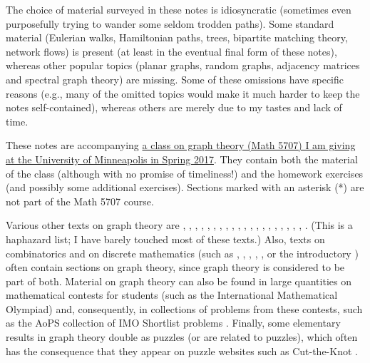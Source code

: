 \documentclass[numbers=enddot,12pt,final,onecolumn,notitlepage]{scrartcl}%
\theoremstyle{definition}
\begin{document}
The choice of material surveyed in these notes is idiosyncratic
(sometimes even purposefully trying to wander some seldom trodden
paths). Some standard material (Eulerian walks, Hamiltonian paths,
trees, bipartite matching theory, network flows) is present (at least
in the eventual final form of these notes), whereas
other popular topics (planar graphs, random graphs, adjacency matrices
and spectral graph theory) are missing. Some of these omissions have
specific reasons (e.g., many of the omitted topics would make it much
harder to keep the notes self-contained), whereas others are merely
due to my tastes and lack of time.

These notes are accompanying
\href{http://www.cip.ifi.lmu.de/~grinberg/t/17s}{a
class on graph theory (Math 5707) I am giving at the University of
Minneapolis in Spring 2017}. They contain both the
material of the class (although with no promise of timeliness!) and the
homework exercises (and possibly some additional exercises).
Sections marked with an asterisk (*) are not part of the Math 5707
course.

Various other texts on graph theory are \cite{Bollob79},
\cite{Bollob98}, \cite{Harary69}, \cite{Harju14}, \cite{Balakr97},
\cite{Jungni13}, \cite{Martin16}, \cite{ThuSwa92},
\cite{BonMur76}, \cite{Ore74}, \cite{BehCha71}, \cite{BeChZh15},
\cite{BonMur08}, \cite{Ruohon13}, \cite{Dieste16}, \cite{Ore90},
\cite{HaHiMo08}, \cite{Berge91}, \cite{ChaLes15}, \cite{Griffi15},
\cite{Wilson96}.
(This is a haphazard list; I have barely touched most of these texts.)
Also, texts on combinatorics and on discrete mathematics (such as
\cite{BenWil12}, \cite{KelTro15}, \cite{PoTaWo83}, \cite{Bona11},
\cite{Guicha16},
or the introductory \cite{LoPeVe03}) often contain
sections on graph theory, since graph theory is considered to be part
of both.
Material on graph theory can also be found in large quantities on
mathematical contests for students (such as the International
Mathematical Olympiad) and, consequently, in collections of problems
from these contests, such as the AoPS collection of IMO Shortlist
problems \cite{AoPS-ISL}.
Finally, some elementary results in graph theory double as puzzles
(or are related to puzzles), which often has the consequence that they
appear on puzzle websites such as Cut-the-Knot \cite{cut-the-knot}.
\end{document}
